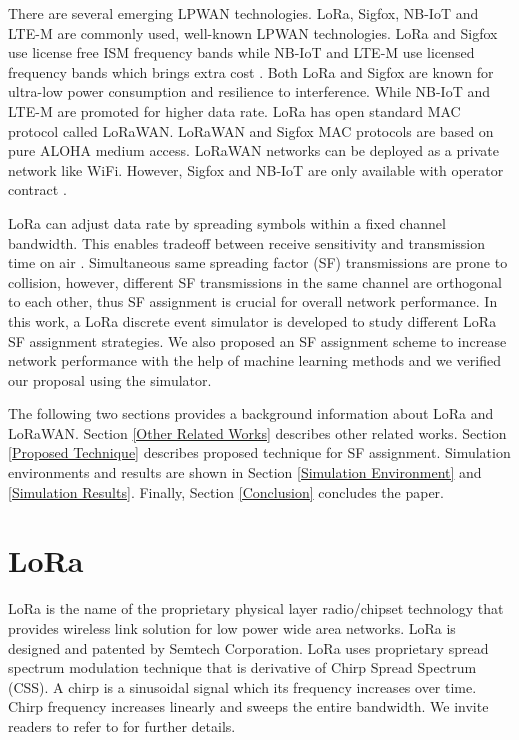 \documentclass[conference]{IEEEtran}
\begin{document}
\par There are several emerging LPWAN technologies. LoRa, Sigfox, NB-IoT and LTE-M are commonly used, well-known LPWAN technologies. LoRa and Sigfox use license free ISM frequency bands while NB-IoT and LTE-M use licensed frequency bands which brings extra cost \cite{7815384}. Both LoRa and Sigfox are known for ultra-low power consumption and resilience to interference. While NB-IoT and LTE-M are promoted for higher data rate. LoRa has open standard MAC protocol called LoRaWAN. LoRaWAN and Sigfox MAC protocols are based on pure ALOHA medium access. LoRaWAN networks can be deployed as a private network like WiFi. However, Sigfox and NB-IoT are only available with operator contract \cite{7815384}.

\par LoRa can adjust data rate by spreading symbols within a fixed channel bandwidth. This enables tradeoff between receive sensitivity and transmission time on air \cite{7803607}. Simultaneous same spreading factor (SF) transmissions are prone to collision, however, different SF transmissions in the same channel are orthogonal to each other, thus SF assignment is crucial for overall network performance. In this work, a LoRa discrete event simulator is developed to study different LoRa SF assignment strategies. We also proposed an SF assignment scheme to increase network performance with the help of machine learning methods and we verified our proposal using the simulator.

\par The following two sections provides a background information about LoRa and LoRaWAN. Section \ref{Other Related Works} describes other related works. Section \ref{Proposed Technique} describes proposed technique for SF assignment. Simulation environments and results are shown in Section \ref{Simulation Environment} and \ref{Simulation Results}. Finally, Section \ref{Conclusion} concludes the paper.


\section{LoRa}
\par LoRa is the name of the proprietary physical layer radio/chipset technology that provides wireless link solution for low power wide area networks. LoRa is designed and patented by Semtech Corporation. LoRa uses proprietary spread spectrum modulation technique that is derivative of Chirp Spread Spectrum (CSS). A chirp is a sinusoidal signal which its frequency increases over time. Chirp frequency increases linearly and sweeps the entire bandwidth. We invite readers to refer to \cite{AN1200.22} for further details.
\end{document}
